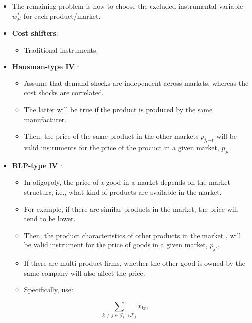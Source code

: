 \documentclass[
]{book}
\providecommand{\tightlist}{%
  \setlength{\itemsep}{0pt}\setlength{\parskip}{0pt}}
\begin{document}
\begin{itemize}
\tightlist
\item
  The remaining problem is how to choose the excluded instrumental variable \(w_{jt}^*\) for each product/market.
\item
  \textbf{Cost shifters}:

  \begin{itemize}
  \tightlist
  \item
    Traditional instruments.
  \end{itemize}
\item
  \textbf{Hausman-type IV} \citep{Hausman1994}:

  \begin{itemize}
  \tightlist
  \item
    Assume that demand shocks are independent across markets, whereas the cost shocks are correlated.
  \item
    The latter will be true if the product is produced by the same manufacturer.
  \item
    Then, the price of the same product in the other markets \(p_{j, -t}\) will be valid instruments for the price of the product in a given market, \(p_{jt}\).
  \end{itemize}
\item
  \textbf{BLP-type IV} \citep{Berry1995a}:

  \begin{itemize}
  \tightlist
  \item
    In oligopoly, the price of a good in a market depends on the market structure, i.e., what kind of products are available in the market.
  \item
    For example, if there are similar products in the market, the price will tend to be lower.
  \item
    Then, the product characteristics of other products in the market , will be valid instrument for the price of goods in a given market, \(p_{jt}\).
  \item
    If there are multi-product firms, whether the other good is owned by the same company will also affect the price.
  \item
    Specifically, \citet{Berry1995a} use:
  \end{itemize}
\end{itemize}

\begin{equation}
\sum_{k \neq j \in \mathcal{J}_t \cap \mathcal{F}_{f}} x_{kt},
\end{equation}
\end{document}
